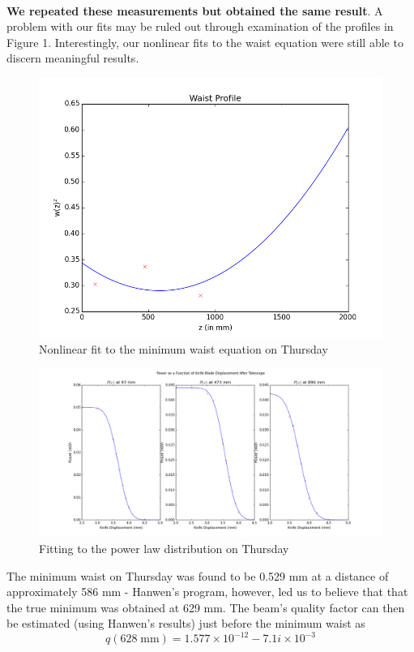 \documentclass[10pt,a4paper]{article}
\begin{document}
\\
\textbf{We repeated these measurements but obtained the same result}. A problem with our fits may be ruled out through examination of the profiles in Figure 1. Interestingly, our nonlinear fits to the waist equation were still able to discern meaningful results. 
\begin{figure}[H]
\centering
\includegraphics[scale=0.5]{../Analysis/thursday_waist_fit.png}
\caption{Nonlinear fit to the minimum waist equation on Thursday}
\end{figure}
\begin{figure}[t]
\centering
\includegraphics[scale=0.4]{../Analysis/thursday_waists.png}
\caption{Fitting to the power law distribution on Thursday}
\end{figure}
\noindent The minimum waist on Thursday was found to be 0.529 mm at a distance of approximately 586 mm - Hanwen's program, however, led us to believe that that the true minimum was obtained at 629 mm. The beam's quality factor can then be estimated (using Hanwen's results) just before the minimum waist as $$q(628\;\mathrm{mm}) = 1.577\times 10^{-12} -7.1i\times10^{-3}$$
\end{document}
